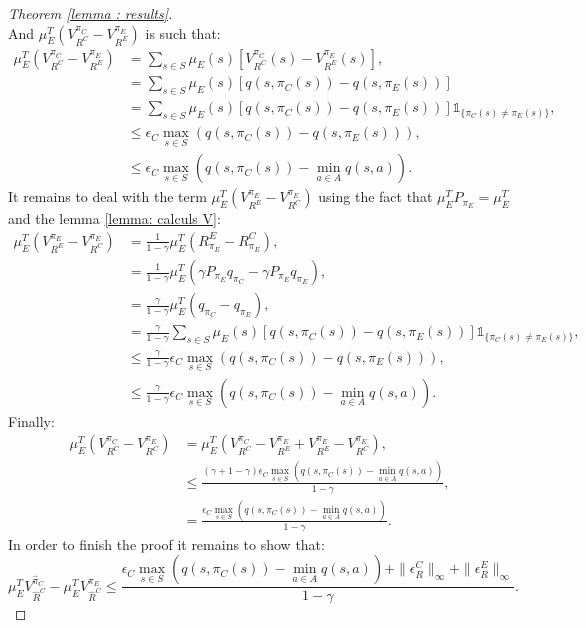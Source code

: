 \documentclass{article} %
\newcommand{\0}{\mathbf{0}}
\newcommand{\1}{\mathbf{1}}
\begin{document}
\begin{proof}[Theorem \ref{lemma : results}]
\begin{equation}
\end{equation}
And $\mu_E^T(V^{\pi_C}_{R^C}-V^{\pi_E}_{R^E})$ is such that:
\begin{align}
\mu_E^T(V^{\pi_C}_{R^C}-V^{\pi_E}_{R^E})&=\sum_{s\in S}\mu_E(s)[V^{\pi_C}_{R^C}(s)-V^{\pi_E}_{R^E}(s)],
\\
&=\sum_{s\in S}\mu_E(s)[q(s,\pi_C(s))-q(s,\pi_E(s))]
\\
&=\sum_{s\in S}\mu_E(s)[q(s,\pi_C(s))-q(s,\pi_E(s))]\mathds{1}_{\{\pi_C(s)\neq\pi_E(s)\}},
\\
&\leq\epsilon_C\max_{s\in S}(q(s,\pi_C(s))-q(s,\pi_E(s))),
\\
&\leq\epsilon_C\max_{s\in S}(q(s,\pi_C(s))-\min_{a\in A}q(s,a)).
\end{align}
It remains to deal with the term $\mu_E^T(V^{\pi_E}_{R^E}-V^{\pi_E}_{R^C})$ using the fact that $\mu_E^TP_{\pi_E}=\mu_E^T$ and the lemma \ref{lemma: calculs V}:
\begin{align}
\mu_E^T(V^{\pi_E}_{R^E}-V^{\pi_E}_{R^C})&=\frac{1}{1-\gamma}\mu_E^T(R^E_{\pi_E}-R^C_{\pi_E}),
\\
&=\frac{1}{1-\gamma}\mu_E^T(\gamma P_{\pi_E}q_{\pi_C}-\gamma P_{\pi_E}q_{\pi_E}),
\\
&=\frac{\gamma}{1-\gamma}\mu_E^T(q_{\pi_C}-q_{\pi_E}),
\\
&=\frac{\gamma}{1-\gamma}\sum_{s\in S}\mu_E(s)[q(s,\pi_C(s))-q(s,\pi_E(s))]\mathds{1}_{\{\pi_C(s)\neq\pi_E(s)\}},
\\
&\leq\frac{\gamma}{1-\gamma}\epsilon_C\max_{s\in S}(q(s,\pi_C(s))-q(s,\pi_E(s))),
\\
&\leq\frac{\gamma}{1-\gamma}\epsilon_C\max_{s\in S}(q(s,\pi_C(s))-\min_{a\in A}q(s,a)).
\end{align}
Finally:
\begin{align}
\mu_E^T(V^{\pi_C}_{R^C}-V^{\pi_E}_{R^C})&=\mu_E^T(V^{\pi_C}_{R^C}-V^{\pi_E}_{R^E}+V^{\pi_E}_{R^E}-V^{\pi_E}_{R^C}),
\\
&\leq\frac{(\gamma+1-\gamma)\epsilon_C\max_{s\in S}(q(s,\pi_C(s))-\min_{a\in A}q(s,a))}{1-\gamma},
\\
&=\frac{\epsilon_C\max_{s\in S}(q(s,\pi_C(s))-\min_{a\in A}q(s,a))}{1-\gamma}.
\end{align}
In order to finish the proof it remains to show that:
\begin{equation}
\mu_E^TV^{\hat{\pi}_C}_{\hat{R}^C}-\mu_E^TV^{\pi_E}_{\hat{R}^C}\leq \frac{\epsilon_C\max_{s\in S}(q(s,\pi_C(s))-\min_{a\in A}q(s,a))+\|\epsilon^C_R\|_{\infty}+\|\epsilon^E_R\|_{\infty}}{1-\gamma}.
\end{equation}

\end{proof}
\end{document}
